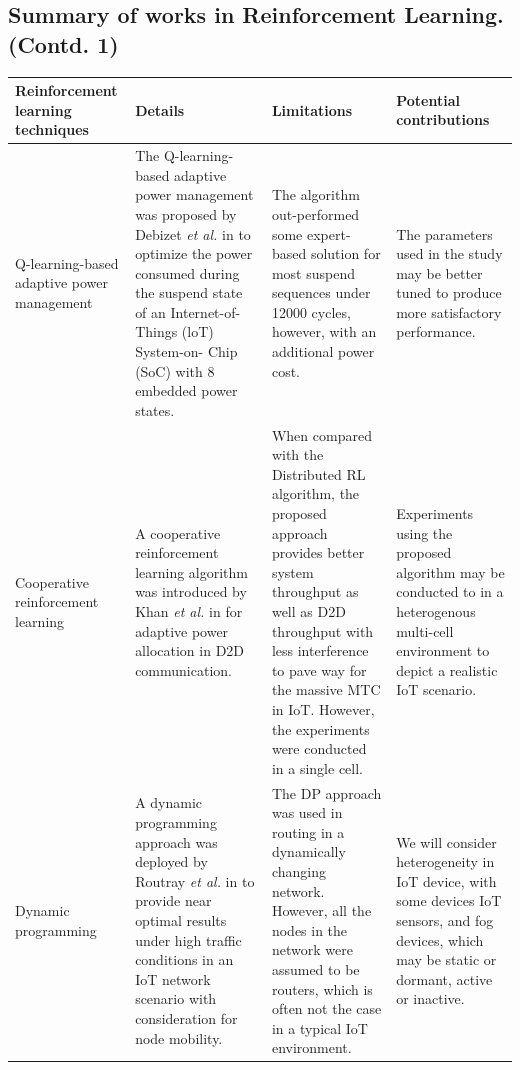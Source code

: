 \documentclass[journal]{IEEEtran}
\begin{document}
\newpage
 \begin{landscape}
%
\renewcommand{\arraystretch}{1.2}

\section*{Summary of works in Reinforcement Learning. (Contd. 1)}
\centering

\begin{tabular}{llll}

 \hline
    Reinforcement learning techniques & Details  & Limitations & Potential contributions \\
  \hline \hline
  \multicolumn{1}{m{3cm}}{Q-learning-based adaptive power management} & \multicolumn{1}{m{6cm}}{The Q-learning-based adaptive power management was proposed by Debizet \emph{et al.} in \cite{Debizet2018} to optimize the power consumed during the suspend state of an Internet-of-Things (loT) System-on-
Chip (SoC) with 8 embedded power states.} & \multicolumn{1}{m{6cm}}{The algorithm out-performed some expert-based
solution for most suspend sequences under 12000 cycles, however, with an additional power cost.} & \multicolumn{1}{m{6cm}}{The parameters used in the study may be better tuned to produce more satisfactory performance.}\\ \hline

\multicolumn{1}{m{3cm}}{Cooperative reinforcement learning} & \multicolumn{1}{m{6cm}}{A cooperative reinforcement learning algorithm was introduced by Khan \emph{et al.} in \cite{Khan2018} for adaptive power allocation in D2D communication.} & \multicolumn{1}{m{6cm}}{When compared with the Distributed RL algorithm, the proposed approach provides better system throughput as well as D2D throughput with less interference to pave way for the massive MTC in IoT. However, the experiments were conducted in a single cell.} & \multicolumn{1}{m{6cm}}{Experiments using the proposed algorithm may be conducted to in a heterogenous multi-cell environment to depict a realistic IoT scenario.}\\ \hline

\multicolumn{1}{m{3cm}}{Dynamic programming} & \multicolumn{1}{m{6cm}}{A dynamic programming approach was deployed by Routray \emph{et al.} in \cite{routray2017} to provide near optimal results under high traffic conditions in an IoT network scenario with consideration for node mobility.} & \multicolumn{1}{m{6cm}}{The DP approach was used in routing in a dynamically changing network. However, all the nodes in the network were assumed to be routers, which is often not the case in a typical IoT environment.} & \multicolumn{1}{m{6cm}}{We will consider heterogeneity in IoT device, with some devices IoT sensors, and fog devices, which may be static or dormant, active or inactive.}\\ \hline


\end{tabular}
\end{landscape}
\end{document}
